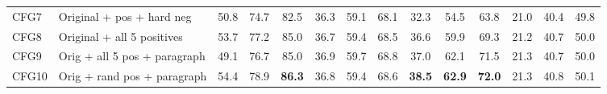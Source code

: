 \documentclass{article}
\begin{document}
\begin{table}[t]
\begin{adjustbox}{max width=\textwidth}
\begin{tabular}{llcccccccccccc}
CFG7 & Original + pos + hard neg & 50.8 & 74.7 & 82.5 & 36.3 & 59.1 & 68.1 & 32.3 & 54.5 & 63.8 & 21.0 & 40.4 & 49.8 \\
CFG8 & Original + all 5 positives & 53.7 & 77.2 & 85.0 & 36.7 & 59.4 & 68.5 & 36.6 & 59.9 & 69.3 & 21.2 & 40.7 & 50.0 \\
CFG9 & Orig + all 5 pos + paragraph & 49.1 & 76.7 & 85.0 & 36.9 & 59.7 & 68.8 & 37.0 & 62.1 & 71.5 & 21.3 & 40.7 & 50.0 \\
CFG10 & Orig + rand pos + paragraph & 54.4 & 78.9 & \textbf{86.3} & 36.8 & 59.4 & 68.6 & \textbf{38.5} & \textbf{62.9} & \textbf{72.0} & 21.3 & 40.8 & 50.1 \\
\bottomrule
\end{tabular}
\end{adjustbox}
\end{table}
\end{document}
